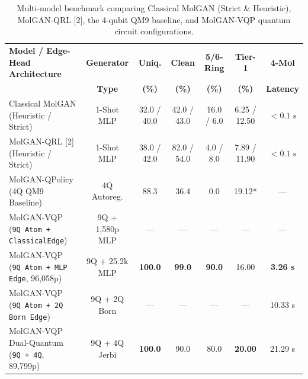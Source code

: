 \documentclass[10pt,a4paper]{article}
\begin{document}
\begin{table}[!htbp]
\centering
\caption{Multi-model benchmark comparing Classical MolGAN (Strict \& Heuristic), MolGAN-QRL [2], the 4-qubit QM9 baseline, and MolGAN-VQP quantum circuit configurations.}
\label{tab:edge_bench}
\setlength{\tabcolsep}{4pt}
\footnotesize
\begin{tabularx}{\textwidth}{@{}>{\raggedright\arraybackslash}X cccccc@{}}
\toprule
\textbf{Model / Edge-Head Architecture} & \textbf{Generator} & \textbf{Uniq.} & \textbf{Clean} & \textbf{5/6-Ring} & \textbf{Tier-1} & \textbf{4-Mol} \\
 & \textbf{Type} & \textbf{(\%)} & \textbf{(\%)} & \textbf{(\%)} & \textbf{(\%)} & \textbf{Latency} \\
\midrule
Classical MolGAN (Heuristic / Strict) & 1-Shot MLP & 32.0 / 40.0 & 42.0 / 43.0 & 16.0 / 6.0 & 6.25 / 12.50 & $<0.1\text{ s}$ \\
MolGAN-QRL [2] (Heuristic / Strict) & 1-Shot MLP & 38.0 / 42.0 & 82.0 / 54.0 & 4.0 / 8.0 & 7.89 / 11.90 & $<0.1\text{ s}$ \\
MolGAN-QPolicy (4Q QM9 Baseline) & 4Q Autoreg. & 88.3 & 36.4 & 0.0 & 19.12* & --- \\
MolGAN-VQP (\texttt{9Q Atom + ClassicalEdge}) & 9Q + 1,580p MLP & --- & --- & --- & --- & --- \\
\rowcolor{lightgray}
MolGAN-VQP (\texttt{9Q Atom + MLP Edge}, 96,058p) & 9Q + 25.2k MLP & \textbf{100.0} & \textbf{99.0} & \textbf{90.0} & 16.00 & \textbf{3.26 s} \\
MolGAN-VQP (\texttt{9Q Atom + 2Q Born Edge}) & 9Q + 2Q Born & --- & --- & --- & --- & 10.33 s \\
\rowcolor{lightgray}
MolGAN-VQP Dual-Quantum (\texttt{9Q + 4Q}, 89,799p) & 9Q + 4Q Jerbi & \textbf{100.0} & 90.0 & 80.0 & \textbf{20.00} & 21.29 s \\
\bottomrule
\end{tabularx}
\end{table}
\end{document}
